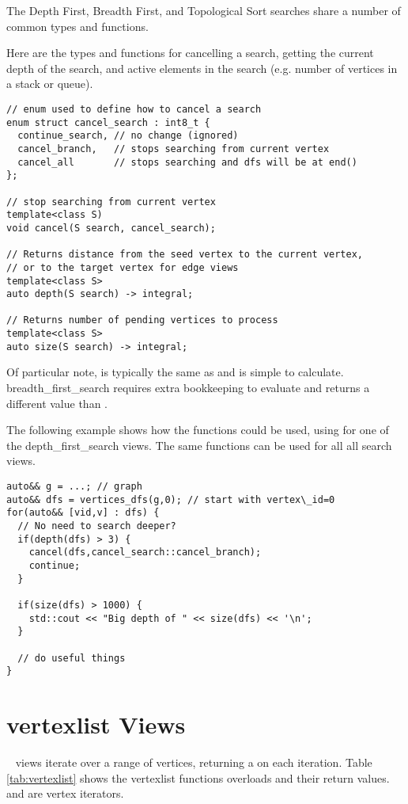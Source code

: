 The Depth First, Breadth First, and Topological Sort searches share a number of common types and functions. 

Here are the types and functions for cancelling a search, getting the current depth of the search, and active elements in the search (e.g. number of vertices in a stack or queue).
\begin{lstlisting}
// enum used to define how to cancel a search
enum struct cancel_search : int8_t { 
  continue_search, // no change (ignored)
  cancel_branch,   // stops searching from current vertex
  cancel_all       // stops searching and dfs will be at end()
};

// stop searching from current vertex
template<class S)
void cancel(S search, cancel_search);

// Returns distance from the seed vertex to the current vertex, 
// or to the target vertex for edge views
template<class S>
auto depth(S search) -> integral;

// Returns number of pending vertices to process
template<class S>
auto size(S search) -> integral; 
\end{lstlisting}

Of particular note,  is typically the same as  and is simple to calculate. breadth\_first\_search requires extra bookkeeping to evaluate  and returns a different value than .

The following example shows how the functions  could be used, using  for one of the depth\_first\_search views. The same functions can be used for all all search views.
\begin{lstlisting}
auto&& g = ...; // graph
auto&& dfs = vertices_dfs(g,0); // start with vertex\_id=0
for(auto&& [vid,v] : dfs) {
  // No need to search deeper?
  if(depth(dfs) > 3) {
    cancel(dfs,cancel_search::cancel_branch);
    continue;
  }
  
  if(size(dfs) > 1000) {
    std::cout << "Big depth of " << size(dfs) << '\n';
  }
  
  // do useful things
}

\end{lstlisting}

\section{vertexlist Views}
\
 views iterate over a range of vertices, returning a  on each iteration. 
Table \ref{tab:vertexlist} shows the vertexlist functions overloads and their return values. \tcode{first} and  are vertex iterators.

